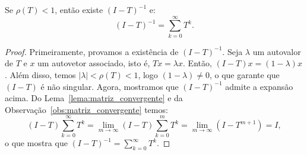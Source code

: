 \begin{lem}\label{lema:inversa}
  Se $\rho(T) < 1$, então existe $(I - T)^{-1}$ e:
  \begin{equation*}
    (I - T)^{-1} = \sum_{k=0}^\infty T^k.
  \end{equation*}
\end{lem}
\begin{proof}
  Primeiramente, provamos a existência de $(I - T)^{-1}$. Seja $\lambda$ um autovalor de $T$ e $x$ um autovetor associado, isto é, $Tx = \lambda x$. Então, $(I-T)x = (1-\lambda)x$. Além disso, temos $|\lambda| < \rho(T) < 1$, logo $(1 - \lambda) \neq 0$, o que garante que $(I - T)$ é não singular.
  Agora, mostramos que $(I - T)^{-1}$ admite a expansão acima. Do Lema~\ref{lema:matriz_convergente} e da Observação~\ref{obs:matriz_convergente} temos:
  \begin{equation*}
   (I - T)\sum_{k=0}^\infty T^k =  \lim_{m\to\infty} (I - T)\sum_{k=0}^m T^k = \lim_{m\to\infty} (I - T^{m+1}) = I,
  \end{equation*}
o que mostra que $\displaystyle (I - T)^{-1} = \sum_{k=0}^\infty T^k$.
\end{proof}

